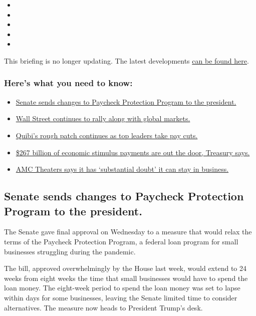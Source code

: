 \begin{itemize}
\item
\item
\item
\item
\item
\end{itemize}

This briefing is no longer updating. The latest developments
\href{https://www.nytimes3xbfgragh.onion/2020/06/04/business/jobless-claims-stock-market-coronavirus.html}{can
be found here}.

\hypertarget{heres-what-you-need-to-know}{%
\subsubsection{Here's what you need to
know:}\label{heres-what-you-need-to-know}}

\begin{itemize}
\tightlist
\item
  \protect\hyperlink{link-7a1554a7}{Senate sends changes to Paycheck
  Protection Program to the president.}
\item
  \protect\hyperlink{link-69518c8}{Wall Street continues to rally along
  with global markets.}
\item
  \protect\hyperlink{link-4e241406}{Quibi's rough patch continues as top
  leaders take pay cuts.}
\item
  \protect\hyperlink{link-3a7eeffd}{\$267 billion of economic stimulus
  payments are out the door, Treasury says.}
\item
  \protect\hyperlink{link-145a169a}{AMC Theaters says it has
  `substantial doubt' it can stay in business.}
\end{itemize}

\hypertarget{senate-sends-changes-to-paycheck-protection-program-to-the-president}{%
\subsection{Senate sends changes to Paycheck Protection Program to the
president.}\label{senate-sends-changes-to-paycheck-protection-program-to-the-president}}

The Senate gave final approval on Wednesday to a measure that would
relax the terms of the Paycheck Protection Program, a federal loan
program for small businesses struggling during the pandemic.

The bill, approved overwhelmingly by the House last week, would extend
to 24 weeks from eight weeks the time that small businesses would have
to spend the loan money. The eight-week period to spend the loan money
was set to lapse within days for some businesses, leaving the Senate
limited time to consider alternatives. The measure now heads to
President Trump's desk.

